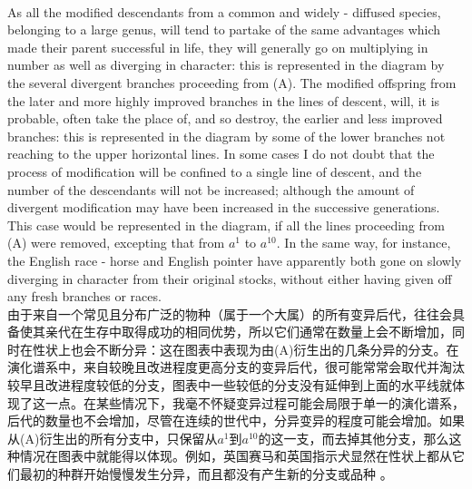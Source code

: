 \documentclass{article}
\begin{document}
\\
As all the modified descendants from a common and widely - diffused species, belonging to a large genus, will tend to partake of the same advantages which made their parent successful in life, they will generally go on multiplying in number as well as diverging in character: this is represented in the diagram by the several divergent branches proceeding from (A). The modified offspring from the later and more highly improved branches in the lines of descent, will, it is probable, often take the place of, and so destroy, the earlier and less improved branches: this is represented in the diagram by some of the lower branches not reaching to the upper horizontal lines. In some cases I do not doubt that the process of modification will be confined to a single line of descent, and the number of the descendants will not be increased; although the amount of divergent modification may have been increased in the successive generations. This case would be represented in the diagram, if all the lines proceeding from (A) were removed, excepting that from $a^1$ to $a^{10}$. In the same way, for instance, the English race - horse and English pointer have apparently both gone on slowly diverging in character from their original stocks, without either having given off any fresh branches or races.\\
由于来自一个常见且分布广泛的物种（属于一个大属）的所有变异后代，往往会具备使其亲代在生存中取得成功的相同优势，所以它们通常在数量上会不断增加，同时在性状上也会不断分异：这在图表中表现为由(A)衍生出的几条分异的分支。在演化谱系中，来自较晚且改进程度更高分支的变异后代，很可能常常会取代并淘汰较早且改进程度较低的分支，图表中一些较低的分支没有延伸到上面的水平线就体现了这一点。在某些情况下，我毫不怀疑变异过程可能会局限于单一的演化谱系，后代的数量也不会增加，尽管在连续的世代中，分异变异的程度可能会增加。如果从(A)衍生出的所有分支中，只保留从$a^1$到$a^{10}$的这一支，而去掉其他分支，那么这种情况在图表中就能得以体现。例如，英国赛马和英国指示犬显然在性状上都从它们最初的种群开始慢慢发生分异，而且都没有产生新的分支或品种 。 \\
\end{document}
